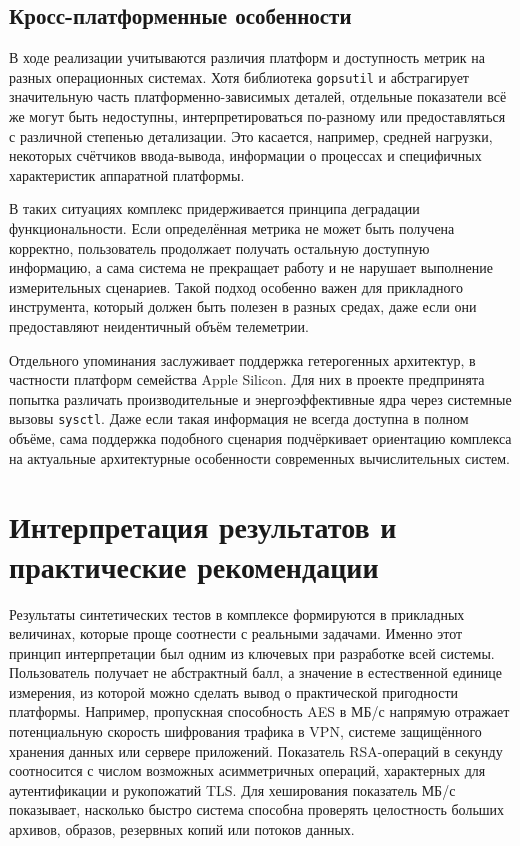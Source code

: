 \subsection{Кросс-платформенные особенности}

В ходе реализации учитываются различия платформ и доступность метрик на разных операционных системах. Хотя библиотека \texttt{gopsutil} и абстрагирует значительную часть платформенно-зависимых деталей, отдельные показатели всё же могут быть недоступны, интерпретироваться по-разному или предоставляться с различной степенью детализации. Это касается, например, средней нагрузки, некоторых счётчиков ввода-вывода, информации о процессах и специфичных характеристик аппаратной платформы.

В таких ситуациях комплекс придерживается принципа деградации функциональности. Если определённая метрика не может быть получена корректно, пользователь продолжает получать остальную доступную информацию, а сама система не прекращает работу и не нарушает выполнение измерительных сценариев. Такой подход особенно важен для прикладного инструмента, который должен быть полезен в разных средах, даже если они предоставляют неидентичный объём телеметрии.

Отдельного упоминания заслуживает поддержка гетерогенных архитектур, в частности платформ семейства Apple Silicon. Для них в проекте предпринята попытка различать производительные и энергоэффективные ядра через системные вызовы \texttt{sysctl}. Даже если такая информация не всегда доступна в полном объёме, сама поддержка подобного сценария подчёркивает ориентацию комплекса на актуальные архитектурные особенности современных вычислительных систем.

\section{Интерпретация результатов и практические рекомендации}

Результаты синтетических тестов в комплексе формируются в прикладных величинах, которые проще соотнести с реальными задачами. Именно этот принцип интерпретации был одним из ключевых при разработке всей системы. Пользователь получает не абстрактный балл, а значение в естественной единице измерения, из которой можно сделать вывод о практической пригодности платформы. Например, пропускная способность AES в МБ/с напрямую отражает потенциальную скорость шифрования трафика в VPN, системе защищённого хранения данных или сервере приложений. Показатель RSA-операций в секунду соотносится с числом возможных асимметричных операций, характерных для аутентификации и рукопожатий TLS. Для хеширования показатель МБ/с показывает, насколько быстро система способна проверять целостность больших архивов, образов, резервных копий или потоков данных.

